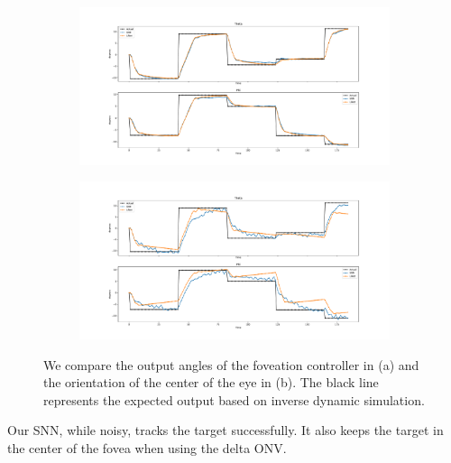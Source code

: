 \documentclass [MS] {UCLAthesis}
\begin{document}
\begin{figure}
    \centering

    \begin{subfigure}[b]{0.8\textwidth}
        \centering
        \includegraphics[width=\textwidth]{saccade_ori_normal}
        \caption{}
        \label{fig:saccade_normal}
    \end{subfigure}

    \begin{subfigure}[b]{0.8\textwidth}
        \centering
        \includegraphics[width=\textwidth]{saccade_ori_delta}
        \caption{}
        \label{fig:saccade_delta}
    \end{subfigure}

    \caption[Saccade eye orientation with different models]{We compare the output angles of the foveation controller in (a) and the orientation of the center of the eye in (b). The black line represents the expected output based on inverse dynamic simulation.}
    \label{fig:saccade}
\end{figure}

Our SNN, while noisy, tracks the target successfully. It also keeps the target in the center of the fovea when using the delta ONV.
\end{document}
